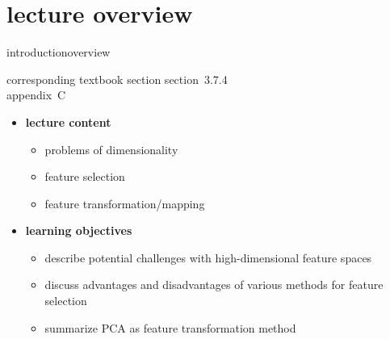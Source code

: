

\subtitle{module 3.7.4: feature dimensionality reduction}


	

    \section[overview]{lecture overview}
        \begin{frame}{introduction}{overview}
            \begin{block}{corresponding textbook section}
                    section~3.7.4\\
                    appendix~C
            \end{block}

            \begin{itemize}
                \item   \textbf{lecture content}
                    \begin{itemize}
                        \item   problems of dimensionality
                        \item   feature selection
                        \item   feature transformation/mapping
                    \end{itemize}
                \bigskip
                \item<2->   \textbf{learning objectives}
                    \begin{itemize}
                        \item   describe potential challenges with high-dimensional feature spaces
                        \item   discuss advantages and disadvantages of various methods for feature selection
                        \item   summarize PCA as feature transformation method
                    \end{itemize}
            \end{itemize}
        \end{frame}

